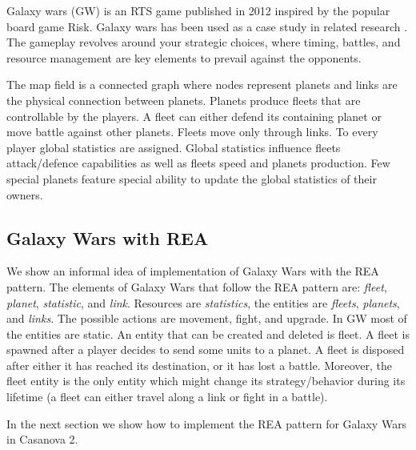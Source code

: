 Galaxy wars (GW) is an RTS game published in 2012 inspired by the popular board game Risk. Galaxy wars has been used as a case study in related research \cite{papers_galaxy_wars}. The gameplay revolves around your strategic choices, where timing, battles, and resource management are key elements to prevail against the opponents.

The map field is a connected graph where nodes represent planets and links are the physical connection between planets. Planets produce fleets that are controllable by the players. A fleet can either defend its containing planet or move battle against other planets. Fleets move only through links. To every player global statistics are assigned. Global statistics influence fleets attack/defence capabilities as well as fleets speed and planets production. Few special planets feature special ability to update the global statistics of their owners.

\subsection{Galaxy Wars with REA}
We show an informal idea of implementation of Galaxy Wars with the REA pattern. The elements of Galaxy Wars that follow the REA pattern are: \textit{fleet}, \textit{planet}, \textit{statistic}, and \textit{link}. Resources are \textit{statistics}, the entities are \textit{fleets}, \textit{planets}, and \textit{links}. The possible actions are movement, fight, and upgrade. In GW most of the entities are static. An entity that can be created and deleted is fleet. A fleet is spawned after a player decides to send some units to a planet. A fleet is disposed after either it has reached its destination, or it has lost a battle. Moreover, the fleet entity is the only entity which might change its strategy/behavior during its lifetime (a fleet can either travel along a link or fight in a battle).

In the next section we show how to implement the REA pattern for Galaxy Wars in Casanova 2.